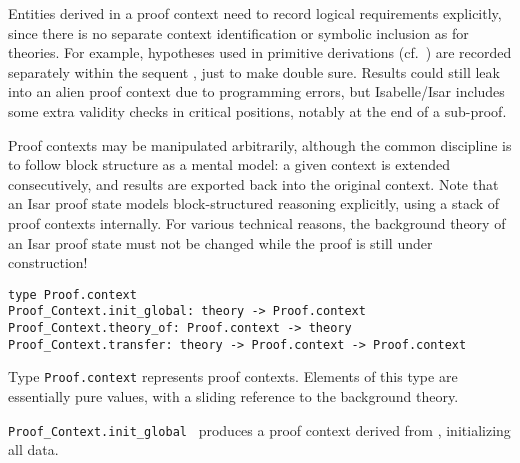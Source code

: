 \begin{isabellebody}
\begin{isamarkuptext}
  Entities derived in a proof context need to record logical
  requirements explicitly, since there is no separate context
  identification or symbolic inclusion as for theories.  For example,
  hypotheses used in primitive derivations (cf.\ )
  are recorded separately within the sequent , just to
  make double sure.  Results could still leak into an alien proof
  context due to programming errors, but Isabelle/Isar includes some
  extra validity checks in critical positions, notably at the end of a
  sub-proof.

  Proof contexts may be manipulated arbitrarily, although the common
  discipline is to follow block structure as a mental model: a given
  context is extended consecutively, and results are exported back
  into the original context.  Note that an Isar proof state models
  block-structured reasoning explicitly, using a stack of proof
  contexts internally.  For various technical reasons, the background
  theory of an Isar proof state must not be changed while the proof is
  still under construction!%
\end{isamarkuptext}%
\isamarkuptrue%
%
\isadelimmlref
%
\endisadelimmlref
%
\isatagmlref
%
\begin{isamarkuptext}%
\begin{mldecls}
  \verb|type Proof.context| \\
  \verb|Proof_Context.init_global: theory -> Proof.context| \\
  \verb|Proof_Context.theory_of: Proof.context -> theory| \\
  \verb|Proof_Context.transfer: theory -> Proof.context -> Proof.context| \\
  \end{mldecls}

  \begin{description}

  \item Type \verb|Proof.context| represents proof contexts.
  Elements of this type are essentially pure values, with a sliding
  reference to the background theory.

  \item \verb|Proof_Context.init_global|~ produces a proof context
  derived from , initializing all data.


\end{description}
\end{isamarkuptext}
\end{isabellebody}

